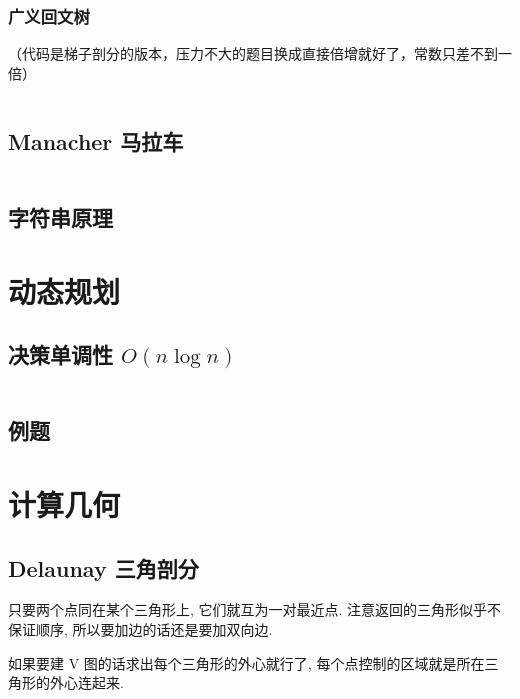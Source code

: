 \documentclass[a4paper, twoside]{article}
\begin{document}
\begin{multicols}{2}
				\subsubsection{广义回文树}
					（代码是梯子剖分的版本，压力不大的题目换成直接倍增就好了，常数只差不到一倍）
					\inputminted{cpp}{../src/string/广义回文树.cpp}



			\subsection{Manacher 马拉车}
				\inputminted{cpp}{../src/string/manacher.cpp}
			


			\subsection{字符串原理}
				

		\newpage
		\section{动态规划}
			\subsection{决策单调性 $O(n\log n)$}
				\inputminted{cpp}{../src/dp/决策单调性.cpp}
			
			\subsection{例题}
				

		\newpage
		\section{计算几何}
		 	\subsection{Delaunay 三角剖分}
				只要两个点同在某个三角形上, 它们就互为一对最近点. 注意返回的三角形似乎不保证顺序, 所以要加边的话还是要加双向边.
				
				如果要建 V 图的话求出每个三角形的外心就行了, 每个点控制的区域就是所在三角形的外心连起来.
				\inputminted{cpp}{../src/geometry/delaunay.cpp}
		
	\end{multicols}
			
\end{document}
